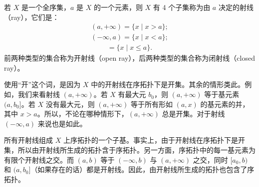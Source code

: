 \documentclass[../../main.tex]{subfiles}
\begin{document}
\begin{definition}[射线]\label{definition:ch02-射线}
若 $X$ 是一个全序集，$a$ 是 $X$ 的一个元素，则 $X$ 有 4 个子集称为由 $a$ 决定的射线（ray），它们是：
\begin{align*}
(a, +\infty) = \{x \mid x > a\};
\end{align*}
\begin{align*}
(-\infty, a) = \{x \mid x < a\};
\end{align*}
\begin{align*}
[a, +\infty) = \{x \mid x \geqslant a\};
\end{align*}
\begin{align*}
(-\infty, a] = \{x \mid x \leqslant a\}.
\end{align*}
前两种类型的集合称为开射线（open ray），后两种类型的集合称为闭射线（closed ray）。
\end{definition}

使用“开”这个词，是因为 $X$ 中的开射线在序拓扑下是开集。其余的情形类此。例如，我们来看射线 $(a, +\infty)$。若 $X$ 有最大元 $b_{0}$，则 $(a, +\infty)$ 等于基元素 $(a, b_{0}]$。若 $X$ 没有最大元，则 $(a, +\infty)$ 等于所有形如 $(a, x)$ 的基元素的并，其中 $x > a$。所以，不论在哪种情形下，$(a, +\infty)$ 总是开集。对于射线 $(-\infty, a)$ 来说也是如此。

所有开射线组成 $X$ 上序拓扑的一个子基。事实上，由于开射线在序拓扑下是开集，所以由开射线所生成的拓扑含于序拓扑。另一方面，序拓扑中的每一基元素为有限个开射线之交。而 $(a, b)$ 等于 $(-\infty, b)$ 与 $(a, +\infty)$ 之交，同时 $[a_{0}, b)$ 和 $(a, b_{0}]$（如果存在的话）都是开射线。因此，由开射线所生成的拓扑也包含了序拓扑。
\end{document}
